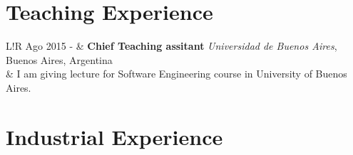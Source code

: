 \documentclass[10pt]{article}
\newcommand\VRule{\color{lightgray}\vrule width 0.5pt}
\begin{document}

\section*{Teaching Experience}

\begin{tabular}{L!{\VRule}R}
Ago 2015 - & \textbf{Chief Teaching assitant} \textit{Universidad de Buenos 
Aires}, Buenos 
Aires, Argentina\\
& I am giving lecture for Software Engineering course in University of Buenos Aires.\\
\end{tabular}


\section*{Industrial Experience}
\end{document}
